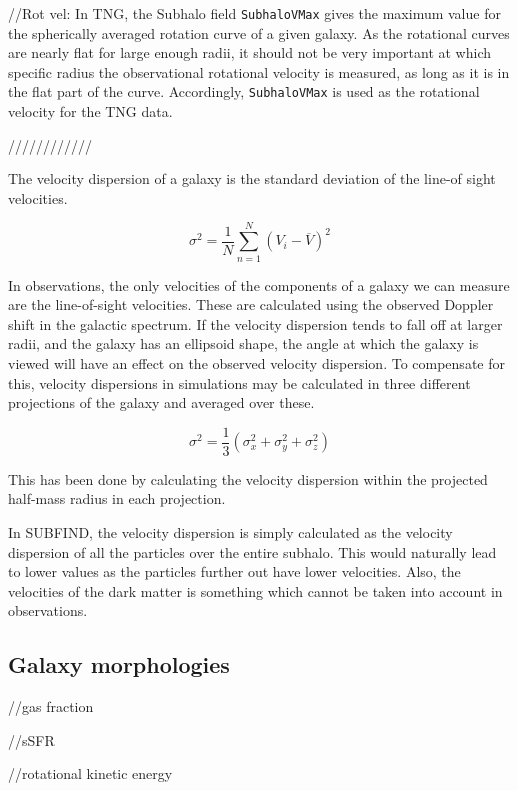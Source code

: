 //Rot vel: In TNG, the Subhalo field \texttt{SubhaloVMax} gives the maximum value for the spherically averaged rotation curve of a given galaxy. As the rotational curves are nearly flat for large enough radii, it should not be very important at which specific radius the observational rotational velocity is measured, as long as it is in the flat part of the curve. Accordingly, \texttt{SubhaloVMax} is used as the rotational velocity for the TNG data.

////////////

The velocity dispersion of a galaxy is the standard deviation of the line-of sight velocities.

\begin{equation} \label{standard_dev}
    \sigma^{2} = \frac{1}{N} \sum_{n=1}^{N} (V_{i} - \overline{V})^2
\end{equation}

In observations, the only velocities of the components of a galaxy we can measure are the line-of-sight velocities. These are calculated using the observed Doppler shift in the galactic spectrum. If the velocity dispersion tends to fall off at larger radii, and the galaxy has an ellipsoid shape, the angle at which the galaxy is viewed will have an effect on the observed velocity dispersion. To compensate for this, velocity dispersions in simulations may be calculated in three different projections of the galaxy and averaged over these. 

\begin{equation} \label{sigma1}
    \sigma^{2} = \frac{1}{3}(\sigma_x^2 + \sigma_y^2 + \sigma_z^2)
\end{equation}

This has been done by calculating the velocity dispersion within the projected half-mass radius in each projection.


In SUBFIND, the velocity dispersion is simply calculated as the velocity dispersion of all the particles over the entire subhalo. This would naturally lead to lower values as the particles further out have lower velocities. Also, the velocities of the dark matter is something which cannot be taken into account in observations.


\subsection{Galaxy morphologies}

//gas fraction

//sSFR

//rotational kinetic energy